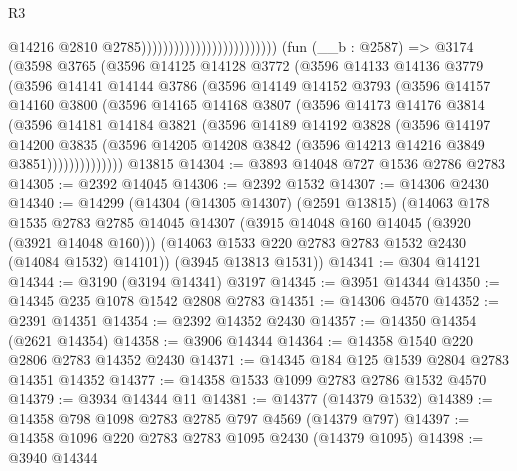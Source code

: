 \begin{lexlean}{R3}
\begin{coremodule}
                                                      @14216
                                                      @2810
                                                      @2785)))))))))))))))))))))))))
    (fun (__b : @2587) =>
    @3174
      (@3598
        @3765
        (@3596
          @14125
          @14128
          @3772
          (@3596
            @14133
            @14136
            @3779
            (@3596
              @14141
              @14144
              @3786
              (@3596
                @14149
                @14152
                @3793
                (@3596
                  @14157
                  @14160
                  @3800
                  (@3596
                    @14165
                    @14168
                    @3807
                    (@3596
                      @14173
                      @14176
                      @3814
                      (@3596
                        @14181
                        @14184
                        @3821
                        (@3596
                          @14189
                          @14192
                          @3828
                          (@3596
                            @14197
                            @14200
                            @3835
                            (@3596
                              @14205
                              @14208
                              @3842
                              (@3596 @14213 @14216 @3849 @3851))))))))))))))
    @13815
@14304 := @3893 @14048 @727 @1536 @2786 @2783
@14305 := @2392 @14045
@14306 := @2392 @1532
@14307 := @14306 @2430
@14340 := @14299
    (@14304
      (@14305 @14307)
      (@2591 @13815)
      (@14063
        @178
        @1535
        @2783
        @2785
        @14045
        @14307
        (@3915 @14048 @160 @14045 (@3920 (@3921 @14048 @160)))
        (@14063 @1533 @220 @2783 @2783 @1532 @2430 (@14084 @1532) @14101))
      (@3945 @13813 @1531))
@14341 := @304 @14121
@14344 := @3190 (@3194 @14341) @3197
@14345 := @3951 @14344
@14350 := @14345 @235 @1078 @1542 @2808 @2783
@14351 := @14306 @4570
@14352 := @2391 @14351
@14354 := @2392 @14352 @2430
@14357 := @14350 @14354 (@2621 @14354)
@14358 := @3906 @14344
@14364 := @14358 @1540 @220 @2806 @2783 @14352 @2430
@14371 := @14345 @184 @125 @1539 @2804 @2783 @14351 @14352
@14377 := @14358 @1533 @1099 @2783 @2786 @1532 @4570
@14379 := @3934 @14344 @11
@14381 := @14377 (@14379 @1532)
@14389 := @14358 @798 @1098 @2783 @2785 @797 @4569 (@14379 @797)
@14397 := @14358 @1096 @220 @2783 @2783 @1095 @2430 (@14379 @1095)
@14398 := @3940 @14344

\end{coremodule}
\end{lexlean}
